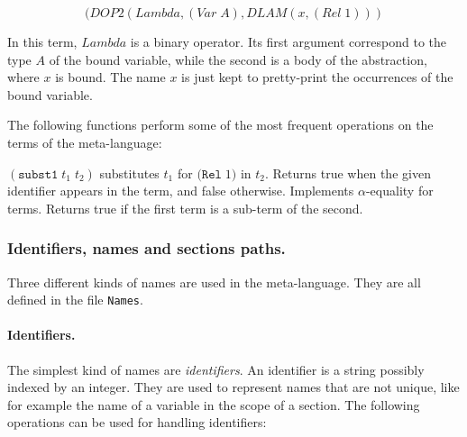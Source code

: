 \begin{displaymath}
(DOP2 (Lambda,(Var\;A),DLAM (x,(Rel\;1)))
\end{displaymath}

In this term, $Lambda$ is a binary operator.  Its first argument
correspond to the type $A$ of the bound variable, while the second is
a body of the abstraction, where $x$ is bound.  The name $x$ is just kept
to pretty-print the occurrences of the bound variable.


The following functions perform some of the most frequent operations
on the terms of the meta-language:
\begin{description}
    {$(\texttt{subst1}\;t_1\;t_2)$ substitutes $t_1$ for 
      $\texttt{(Rel}\;1)$ in $t_2$.}
    {Returns true when the given identifier appears in the term,
    and false otherwise.}
    {Implements $\alpha$-equality for terms.}  
    {Returns true if the first term is a sub-term of the second.}
\end{description}

\subsubsection{Identifiers, names and sections paths.} 

Three different kinds of names are used in the meta-language. They are
all defined in the \ocaml{} file \texttt{Names}.

\paragraph{Identifiers.}  The simplest kind of names are
\textsl{identifiers}. An identifier is a string possibly indexed by an
integer. They are used to represent names that are not unique, like
for example the name of a variable in the scope of a section.  The
following operations can be used for handling identifiers:


